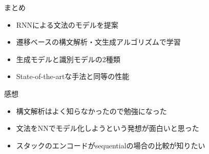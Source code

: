 \documentclass[aspectratio=43,unicode,10pt]{beamer}
\begin{document}
\begin{frame}{まとめ}
  \begin{itemize}
    \item RNNによる文法のモデルを提案
    \item 遷移ベースの構文解析・文生成アルゴリズムで学習
    \item 生成モデルと識別モデルの2種類
    \item State-of-the-artな手法と同等の性能
  \end{itemize}
\end{frame}

\begin{frame}{感想}
  \begin{itemize}
    \item 構文解析はよく知らなかったので勉強になった
    \item 文法をNNでモデル化しようという発想が面白いと思った
    \item スタックのエンコードがsequentialの場合の比較が知りたい
  \end{itemize}
\end{frame}
\end{document}
